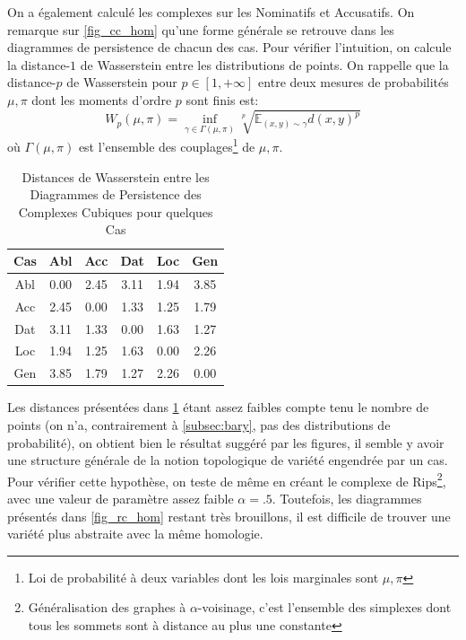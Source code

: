 \documentclass{cours}
\begin{document}
On a également calculé les complexes sur les Nominatifs et Accusatifs. On remarque sur \ref{fig_cc_hom} qu'une forme générale se retrouve dans les diagrammes de persistence de chacun des cas.
Pour vérifier l'intuition, on calcule la distance-$1$ de Wasserstein entre les distributions de points. On rappelle que la distance-$p$ de Wasserstein pour $p \in \left[1, +\infty\right]$ entre deux mesures de probabilités $\mu, \pi$ dont les moments d'ordre $p$ sont finis est:
\begin{equation*}
W_{p}(\mu, \pi) = \inf_{\gamma\in\Gamma\left(\mu, \pi\right)}\sqrt[p]{\mathbb{E}_{(x, y) \sim \gamma}d(x, y)^{p}}
\end{equation*}
où $\Gamma\left(\mu, \pi\right)$ est l'ensemble des couplages\footnote{Loi de probabilité à deux variables dont les lois marginales sont $\mu, \pi$} de $\mu, \pi$.

\begin{table}
\centering
\begin{tabular}{c|ccccc}
	\toprule
	Cas & Abl & Acc & Dat & Loc & Gen\\
	\midrule
	Abl & 0.00 & 2.45 & 3.11 & 1.94 & 3.85\\
	Acc & 2.45 & 0.00 & 1.33 & 1.25 & 1.79\\
	Dat & 3.11 & 1.33 & 0.00 & 1.63 & 1.27\\
	Loc & 1.94 & 1.25 & 1.63 & 0.00 & 2.26\\
	Gen & 3.85 & 1.79 & 1.27 & 2.26 & 0.00\\
	\bottomrule
\end{tabular}
\caption{Distances de Wasserstein entre les Diagrammes de Persistence des Complexes Cubiques pour quelques Cas}
\label{tab_wass_cc}
\end{table}

Les distances présentées dans \ref{tab_wass_cc} étant assez faibles compte tenu le nombre de points (on n'a, contrairement à \ref{subsec:bary}, pas des distributions de probabilité), on obtient bien le résultat suggéré par les figures, il semble y avoir une structure générale de la notion topologique de variété engendrée par un cas.
Pour vérifier cette hypothèse, on teste de même en créant le complexe de Rips\footnote{Généralisation des graphes à $\alpha$-voisinage, c'est l'ensemble des simplexes dont tous les sommets sont à distance au plus une constante}, avec une valeur de paramètre assez faible $\alpha = .5$.
Toutefois, les diagrammes présentés dans \ref{fig_rc_hom} restant très brouillons, il est difficile de trouver une variété plus abstraite avec la même homologie.
\end{document}
